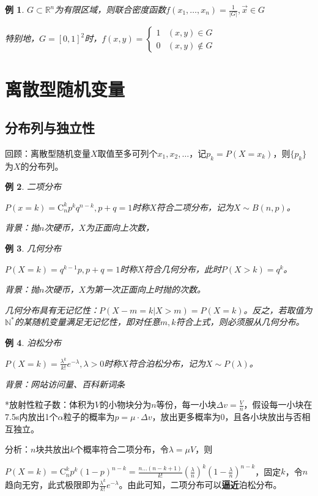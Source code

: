\documentclass[a4paper,UTF8,fontset=windows]{ctexart}
\newtheorem{exmp}{例}[section]
\begin{document}
\begin{exmp}
$G\subset\mathbb{R}^n$为有限区域，则联合密度函数$f(x_1,\dots,x_n)=\frac{1}{|G|},\vec{x}\in G$

特别地，$G=[0,1]^2$时，$f(x,y)=\begin{cases}1&(x,y)\in G\\0&(x,y)\notin G\end{cases}$
\end{exmp}

\section{离散型随机变量}
\subsection{分布列与独立性}
回顾：离散型随机变量$X$取值至多可列个$x_1,x_2,\dots$，记$p_k=P(X=x_k)$，则$\{p_k\}$为$X$的分布列。

\begin{exmp} 二项分布

$P(x=k)=\mathrm{C}_n^kp^kq^{n-k},p+q=1$时称$X$符合二项分布，记为$X\sim B(n,p)$。

背景：抛$n$次硬币，$X$为正面向上次数，
\end{exmp}

\begin{exmp} 几何分布

$P(X=k)=q^{k-1}p,p+q=1$时称$X$符合几何分布，此时$P(X>k)=q^k$。

背景：抛$n$次硬币，$X$为第一次正面向上时抛的次数。

几何分布具有\emph{无记忆性}：$P(X-m=k|X>m)=P(X=k)$。反之，若取值为$\mathbb{N}^*$的某随机变量满足无记忆性，即对任意$m,k$符合上式，则必须服从几何分布。
\end{exmp}

\begin{exmp} 泊松分布

$P(X=k)=\frac{\lambda^k}{k!}e^{-\lambda},\lambda>0$时称$X$符合泊松分布，记为$X\sim P(\lambda)$。

背景：网站访问量、百科新词条
\end{exmp}

*放射性粒子数：体积为$V$的小物块分为$n$等份，每一小块$\Delta v=\frac{V}{n}$，假设每一小块在7.5s内放出1个$\alpha$粒子的概率为$p=\mu\cdot\Delta v$，放出更多概率为0，且各小块放出与否相互独立。

分析：$n$块共放出$k$个概率符合二项分布，令$\lambda=\mu V$，则

$P(X=k)=\mathrm{C}_n^kp^k(1-p)^{n-k}=\frac{n\dots(n-k+1)}{k!}\left(\frac{\lambda}{n}\right)^k\left(1-\frac{\lambda}{n}\right)^{n-k}$，固定$k$，令$n$趋向无穷，此式极限即为$\frac{\lambda^k}{k!}e^{-\lambda}$。由此可知，二项分布可以\textbf{逼近}泊松分布。
\end{document}
